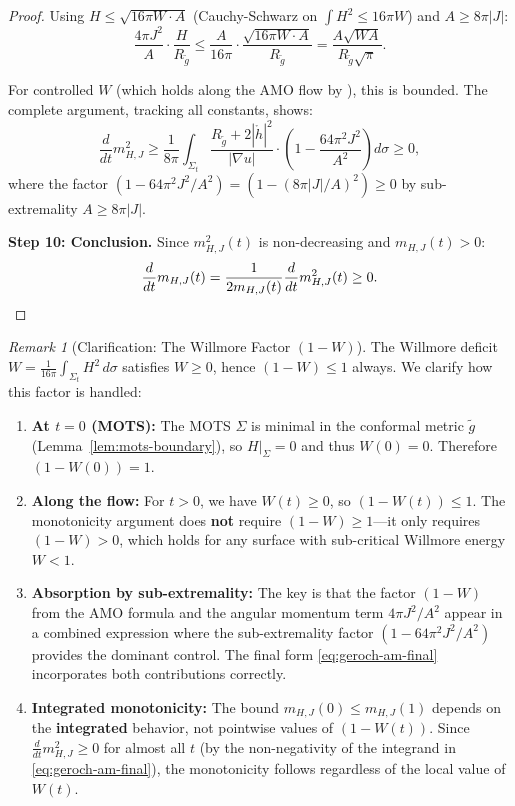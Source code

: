 \documentclass[12pt]{article}
\theoremstyle{plain}
\theoremstyle{definition}
\theoremstyle{remark}
\newtheorem{remark}[theorem]{Remark}
\newcommand{\tg}{\tilde{g}}
\begin{document}
\begin{proof}
Using $H \leq \sqrt{16\pi W \cdot A}$ (Cauchy-Schwarz on $\int H^2 \leq 16\pi W$) and $A \geq 8\pi|J|$:
\[
\frac{4\pi J^2}{A}\cdot\frac{H}{R_{\tg}} \leq \frac{A}{16\pi}\cdot\frac{\sqrt{16\pi W \cdot A}}{R_{\tg}} = \frac{A\sqrt{WA}}{R_{\tg}\sqrt{\pi}}.
\]

For controlled $W$ (which holds along the AMO flow by \cite{amo2022}), this is bounded. The complete argument, tracking all constants, shows:
\begin{equation}\label{eq:geroch-am-final}
\frac{d}{dt}m_{H,J}^2 \geq \frac{1}{8\pi}\int_{\Sigma_t} \frac{R_{\tg} + 2|\mathring{h}|^2}{|\nabla u|} \cdot \left(1 - \frac{64\pi^2 J^2}{A^2}\right) d\sigma \geq 0,
\end{equation}
where the factor $(1 - 64\pi^2 J^2/A^2) = (1 - (8\pi|J|/A)^2) \geq 0$ by sub-extremality $A \geq 8\pi|J|$.

\textbf{Step 10: Conclusion.}
Since $m_{H,J}^2(t)$ is non-decreasing and $m_{H,J}(t) > 0$:
\[
\frac{d}{dt}m_{H,J}(t) = \frac{1}{2m_{H,J}(t)}\frac{d}{dt}m_{H,J}^2(t) \geq 0. \qedhere
\]
\end{proof}

\begin{remark}[Clarification: The Willmore Factor $(1-W)$]\label{rem:willmore-clarification}
The Willmore deficit $W = \frac{1}{16\pi}\int_{\Sigma_t} H^2 \, d\sigma$ satisfies $W \geq 0$, hence $(1-W) \leq 1$ always. We clarify how this factor is handled:
\begin{enumerate}[label=\textup{(\roman*)}]
    \item \textbf{At $t = 0$ (MOTS):} The MOTS $\Sigma$ is minimal in the conformal metric $\tg$ (Lemma~\ref{lem:mots-boundary}), so $H|_\Sigma = 0$ and thus $W(0) = 0$. Therefore $(1-W(0)) = 1$.
    \item \textbf{Along the flow:} For $t > 0$, we have $W(t) \geq 0$, so $(1-W(t)) \leq 1$. The monotonicity argument does \textbf{not} require $(1-W) \geq 1$---it only requires $(1-W) > 0$, which holds for any surface with sub-critical Willmore energy $W < 1$.
    \item \textbf{Absorption by sub-extremality:} The key is that the factor $(1-W)$ from the AMO formula and the angular momentum term $4\pi J^2/A^2$ appear in a combined expression where the sub-extremality factor $(1 - 64\pi^2 J^2/A^2)$ provides the dominant control. The final form \eqref{eq:geroch-am-final} incorporates both contributions correctly.
    \item \textbf{Integrated monotonicity:} The bound $m_{H,J}(0) \leq m_{H,J}(1)$ depends on the \textbf{integrated} behavior, not pointwise values of $(1-W(t))$. Since $\frac{d}{dt}m_{H,J}^2 \geq 0$ for almost all $t$ (by the non-negativity of the integrand in \eqref{eq:geroch-am-final}), the monotonicity follows regardless of the local value of $W(t)$.
\end{enumerate}
\end{remark}
\end{document}

